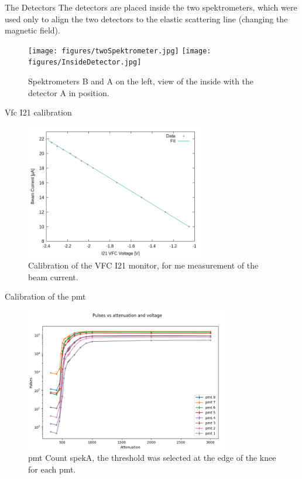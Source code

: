 \documentclass[8pt,a4paper]{beamer}
\begin{document}
\begin{frame}{The Detectors}
The detectors are placed inside the two spektrometers, which were used only to align the two detectors to the elastic scattering line (changing the magnetic field).

\begin{figure}[hbtp]
\centering
\texttt{[image: figures/twoSpektrometer.jpg]}
\hspace{1cm}
\texttt{[image: figures/InsideDetector.jpg]} 
\caption{Spektrometers B and A on the left, view of the inside with the detector A in position.}
\end{figure}


\end{frame}

\begin{frame}{Vfc I21 calibration}
\begin{figure}[hbtp]
\centering
\includegraphics[width = 0.7\textwidth]{figures/Calib_I21_from_Pb_runs.png}
\caption{ Calibration of the VFC I21 monitor, for me measurement of the beam current.}
\end{figure}

\end{frame}

\begin{frame}{Calibration of the pmt}

\begin{figure}[hbtp]
\caption{pmt Count spekA, the threshold was selected at the edge of the knee for each pmt.}
\centering
\includegraphics[width = 0.8\textwidth]{figures/Calibration.png}
\end{figure}

\end{frame}
\end{document}
